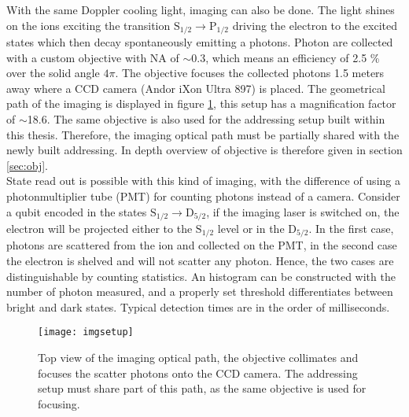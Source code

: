 With the same Doppler cooling light, imaging can also be done. The light shines on the ions exciting the transition $\text{S}_{1/2} \to \text{P}_{1/2}$ driving the electron to the excited states which then decay spontaneously emitting a photons. Photon are collected with a custom objective with NA of $\sim 0.3$, which means an efficiency of 2.5 \% over the solid angle $4\pi$. The objective focuses the collected photons 1.5 meters away where a CCD camera (Andor iXon Ultra 897) is placed. The geometrical path of the imaging is displayed in figure \ref{imgsetup}, this setup has a magnification factor of $\sim$18.6. The same objective is also used for the addressing setup built within this thesis. Therefore, the imaging optical path must be partially shared with the newly built addressing. In depth overview of objective is therefore given in section \ref{sec:obj}.\\
State read out is possible with this kind of imaging, with the difference of using a photonmultiplier tube (PMT) for counting photons instead of a camera. Consider a qubit encoded in the states $\text{S}_{1/2} \to \text{D}_{5/2}$, if the imaging laser is switched on, the electron will be projected either to the $\text{S}_{1/2}$ level or in the $\text{D}_{5/2} $. In the first case, photons are scattered from the ion and collected on the PMT, in the second case the electron is shelved and will not scatter any photon. Hence, the two cases are distinguishable by counting statistics. An histogram can be constructed  with the number of photon measured, and a properly set threshold differentiates between bright and dark states. Typical detection times are in the order of milliseconds.

\begin{figure}
\centering
\texttt{[image: imgsetup]}
\caption{Top view of the imaging optical path, the objective collimates and focuses the scatter photons onto the CCD camera. The addressing setup must share part of this path, as the same objective is used for focusing.}
\label{imgsetup}
\end{figure}



